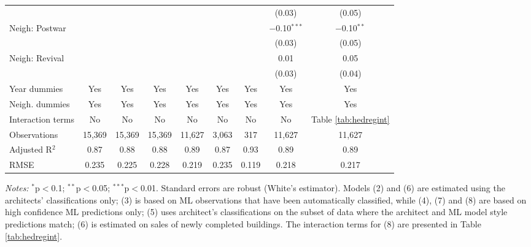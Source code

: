 \documentclass[]{article}
\begin{document}
\begin{table}[!htbp]
\begin{tabular}{@{\extracolsep{5pt}}lcccccccc}
  &  &  &  &  &  &  & (0.03) & (0.05) \\ 
  Neigh: Postwar &  &  &  &  &  &  & $-$0.10$^{***}$ & $-$0.10$^{**}$ \\ 
  &  &  &  &  &  &  & (0.03) & (0.05) \\ 
  Neigh: Revival &  &  &  &  &  &  & 0.01 & 0.05 \\ 
  &  &  &  &  &  &  & (0.03) & (0.04) \\ 
  \midrule
  Year dummies & Yes & Yes & Yes & Yes & Yes & Yes & Yes & Yes \\ 
Neigh. dummies & Yes & Yes & Yes & Yes & Yes & Yes & Yes & Yes \\ 
Interaction terms & No & No & No & No & No & No & No & Table \ref{tab:hedregint} \\ 
Observations & 15,369 & 15,369 & 15,369 & 11,627 & 3,063 & 317 & 11,627 & 11,627 \\ 
Adjusted R$^{2}$ & 0.87 & 0.88 & 0.88 & 0.89 & 0.87 & 0.93 & 0.89 & 0.89 \\ 
RMSE & 0.235 & 0.225 & 0.228 & 0.219 & 0.235 & 0.119 & 0.218 & 0.217 \\ 
\bottomrule
\end{tabular} 
\begin{minipage}{\textwidth}
\vspace{0.25cm}
\footnotesize \emph{Notes:} $^{*}$p$<$0.1; $^{**}$p$<$0.05; $^{***}$p$<$0.01. Standard errors are robust (White's estimator). Models (2) and (6) are estimated using the architects' classifications only; (3) is based on ML observations that have been automatically classified, while (4), (7) and (8) are based on high confidence ML predictions only; (5) uses architect's classifications on the subset of data where the architect and ML model style predictions match; (6) is estimated on sales of newly completed buildings. The interaction terms for (8) are presented in Table \ref{tab:hedregint}.  
\end{minipage}
\end{table}

\newpage
\end{document}
